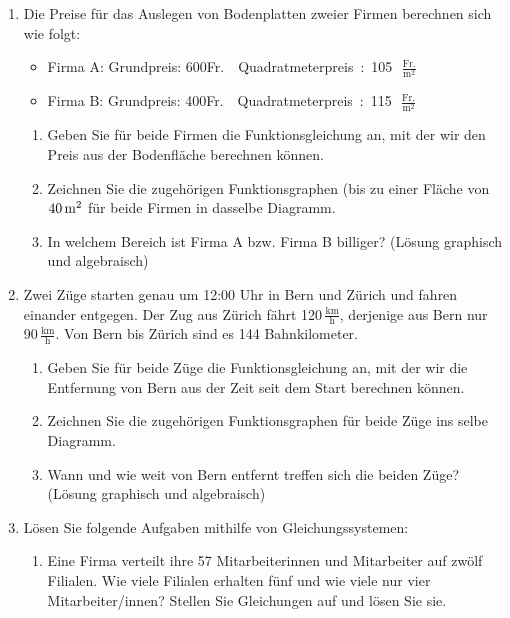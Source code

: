 \documentclass[%
11pt,%
twoside,%
titlepage,%
german,%
]{scrartcl}
\newcommand{\ufrac}[2]{\ensuremath{\,\frac{\mathrm{#1}}{\mathrm{#2}}}}
\begin{document}
\begin{enumerate}
\begin{enumerate}
  \end{enumerate}

\item Die Preise f\"ur das Auslegen von Bodenplatten zweier Firmen berechnen sich wie folgt:
  \begin{itemize}
  \item Firma A: Grundpreis: 600\unit{Fr.} \qquad Quadratmeterpreis: 105\ufrac{Fr.}{m^2}
  \item Firma B: Grundpreis: 400\unit{Fr.} \qquad Quadratmeterpreis: 115\ufrac{Fr.}{m^2}
  \end{itemize}
    \begin{enumerate}
    \item Geben Sie f\"ur beide Firmen die Funktionsgleichung an, mit der wir den Preis aus der Bodenfl\"ache berechnen k\"onnen.
    \item Zeichnen Sie die zugeh\"origen Funktionsgraphen (bis zu einer Fl\"ache von $\unit[40]{m^2}$ f\"ur beide Firmen in dasselbe Diagramm.
    \item In welchem Bereich ist Firma A bzw. Firma B billiger? (L\"osung graphisch und algebraisch)
    \end{enumerate}

\item Zwei Z\"uge starten genau um 12:00 Uhr in Bern und Z\"urich und fahren einander entgegen. Der Zug aus Z\"urich f\"ahrt 120\ufrac{km}{h}, derjenige aus Bern nur 90\ufrac{km}{h}. Von Bern bis Z\"urich sind es 144 Bahnkilometer.
  \begin{enumerate}
  \item Geben Sie f\"ur beide Z\"uge die Funktionsgleichung an, mit der wir die Entfernung von Bern aus der Zeit seit dem Start berechnen k\"onnen.
  \item Zeichnen Sie die zugeh\"origen Funktionsgraphen f\"ur beide Z\"uge ins selbe Diagramm.
  \item Wann und wie weit von Bern entfernt treffen sich die beiden Z\"uge? (L\"osung graphisch und algebraisch)
  \end{enumerate}

\item L\"osen Sie folgende Aufgaben mithilfe von Gleichungssystemen:
  \begin{enumerate}
  \item Eine Firma verteilt ihre 57 Mitarbeiterinnen und Mitarbeiter auf zw\"olf Filialen. Wie viele Filialen erhalten f\"unf und wie viele nur vier Mitarbeiter/innen? Stellen Sie Gleichungen auf und l\"osen Sie sie.
    

\end{enumerate}
\end{enumerate}
\end{document}
